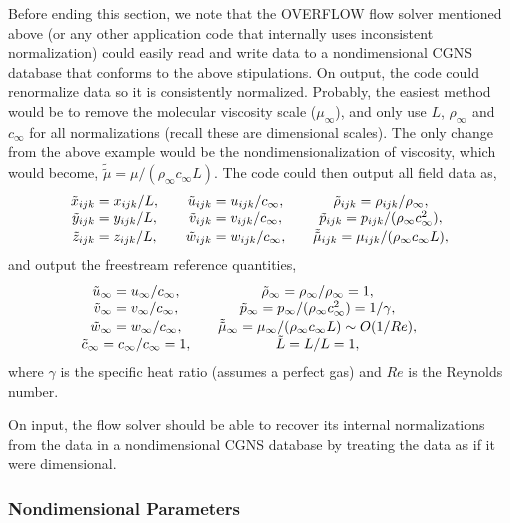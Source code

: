Before ending this section, we note that the OVERFLOW flow solver
mentioned above (or any other application code that internally uses
inconsistent normalization) could easily read and write data to a
nondimensional CGNS database that conforms to the above stipulations.
On output, the code could renormalize data so it is consistently
normalized.
Probably, the easiest method would be to remove the molecular viscosity
scale ($\mu_\infty$), and only use $L$, $\rho_\infty$ and $c_\infty$ for
all normalizations (recall these are dimensional scales).
The only change from the above example would be the nondimensionalization
of viscosity, which would become,
$\tilde{\tilde{\mu}} = \mu / (\rho_\infty c_\infty L).$
The code could then output all field data as,
$$
\begin{array}{c@{\qquad}c@{\qquad}c}
 \tilde{x}_{ijk} = x_{ijk}/L, & \tilde{u}_{ijk} = u_{ijk}/c_\infty, & \tilde{\rho}_{ijk} = \rho_{ijk}/\rho_\infty, \\
 \tilde{y}_{ijk} = y_{ijk}/L, & \tilde{v}_{ijk} = v_{ijk}/c_\infty, & \tilde{p}_{ijk} = p_{ijk}/(\rho_\infty c_\infty^2), \\[.02in]
 \tilde{z}_{ijk} = z_{ijk}/L, & \tilde{w}_{ijk} = w_{ijk}/c_\infty, & \tilde{\tilde{\mu}}_{ijk} = \mu_{ijk} / (\rho_\infty c_\infty L),
\end{array}
$$
and output the freestream reference quantities,
$$
\begin{array}{c@{\qquad}c@{\qquad}c}
 \tilde{u}_\infty = u_\infty/c_\infty,     & \tilde{\rho}_\infty = \rho_\infty/\rho_\infty = 1, \\
 \tilde{v}_\infty = v_\infty/c_\infty,     & \tilde{p}_\infty = p_\infty/(\rho_\infty c_\infty^2) = 1/\gamma, \\[.02in]
 \tilde{w}_\infty = w_\infty/c_\infty,     & \tilde{\tilde{\mu}}_\infty = \mu_\infty / (\rho_\infty c_\infty L) \sim O(1/Re), \\
 \tilde{c}_\infty = c_\infty/c_\infty = 1, & \tilde{L} = L/L = 1,
\end{array}
$$
where $\gamma$ is the specific heat ratio (assumes a perfect gas) and
$Re$ is the Reynolds number.

On input, the flow solver should be able to recover its internal
normalizations from the data in a nondimensional CGNS database by
treating the data as if it were dimensional.

\subsubsection{Nondimensional Parameters}

